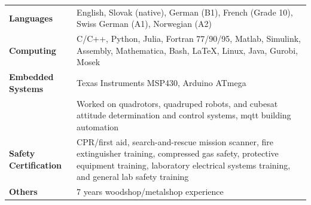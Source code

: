 
\begin{tabular}{p{} p{}}
\textbf{Languages} & English, Slovak (native), German (B1), French (Grade 10), \newline Swiss German (A1), Norwegian (A2) \\
\textbf{Computing} & C/C++, Python, Julia, Fortran 77/90/95, Matlab, Simulink, \newline Assembly,  Mathematica,  Bash, LaTeX, Linux, Java, Gurobi, Mosek \\
\textbf{Embedded Systems} & Texas Instruments MSP430, Arduino ATmega \\
                   & Worked on quadrotors, quadruped robots, and cubesat attitude \newline determination and control systems, mqtt building automation \\
\textbf{Safety Certification} & CPR/first aid, search-and-rescue mission scanner, fire extinguisher \newline training, compressed gas safety,  protective equipment training, \newline laboratory electrical systems training,  and general lab safety training \\
\textbf{Others} & 7 years woodshop/metalshop experience \\
\end{tabular}

